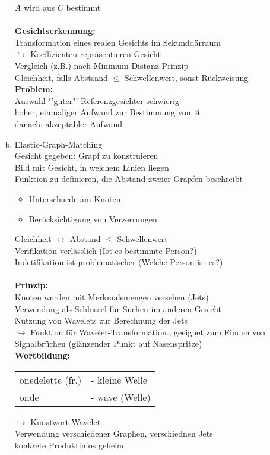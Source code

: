 \documentclass[a4paper,12pt]{scrreprt}
\newcommand{\Nb}[1]{\textbf{#1}}
\begin{document}
\begin{enumerate}[a)]
  $A$ wird aus $C$ bestimmt\\
  \\
  \Nb{Gesichtserkennung:}\\
  Transformation eines realen Gesichts im Sekunddärraum\\
  $\hookrightarrow$ Koeffizienten repräsentieren Gesicht\\
  Vergleich (z.B.) nach Minimum-Distanz-Prinzip\\
  Gleichheit, falls Abstsand $\leq$ Schwellenwert, sonst Rückweisung\\
  \Nb{Problem:}\\
  Auswahl "'guter"' Referenzgesichter schwierig\\
  hoher, einmaliger Aufwand zur Bestimmung von $A$\\
  danach: akzeptabler Aufwand\\
 \item Elastic-Graph-Matching\\
 Gesicht gegeben: Grapf zu konstruieren\\
 Bild mit Gesicht, in welchem Linien liegen\\ 
 Funktion zu definieren, die Abstand zweier Grapfen beschreibt
 \begin{itemize}
  \item Unterschuede am Knoten
  \item Berücksichtigung von Verzerrungen
 \end{itemize}
 Gleichheit $ \leftrightarrow$ Abstand $\leq$ Schwellenwert\\
 Verifikation verlässlich (Ist es bestimmte Person?)\\
 Indetifikation ist problematischer (Welche Person ist es?)\\
 \\
 \Nb{Prinzip:}\\
 Knoten werden mit Merkmalsmengen versehen (Jets)\\
 Verwendung als Schlüssel für Suchen im anderen Gesicht\\
 Nutzung von Wavelets zur Berechnung der Jets\\
 $\hookrightarrow$ Funktion für Wavelet-Transformation., geeignet zum Finden von Signalbrüchen (glänzender Punkt auf Nasenspritze)\\
 \Nb{Wortbildung:}\\
 \begin{tabular}{l l }
  onedelette (fr.)& - kleine Welle\\
 onde & - wave (Welle)\\
 \end{tabular}
 $\hookrightarrow$ Kunstwort Wavelet\\
 Verwendung verschiedener Graphen, verschiednen Jets\\
 konkrete Produktinfos geheim\\
\end{enumerate}
\end{document}
